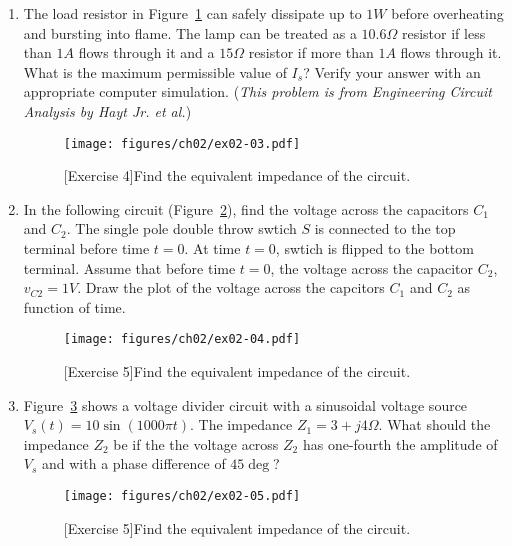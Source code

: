 \begin{enumerate}
    \item The load resistor in Figure~\ref{fig:ex02-03} can safely dissipate up to $1W$ before overheating and bursting into flame. The lamp can be treated as a $10.6\Omega$ resistor if less than $1A$ flows through it and a $15\Omega$ resistor if more than $1A$ flows through it. What is the maximum permissible value of $I_s$? Verify your answer with an appropriate computer simulation. (\textit{This problem is from Engineering Circuit Analysis by Hayt Jr. et al.})
    \begin{figure}[h]
        \centering
        \texttt{[image: figures/ch02/ex02-03.pdf]}
        \caption{[Exercise 4]Find the equivalent impedance of the circuit.}
        \label{fig:ex02-03}
    \end{figure}
    
    \item In the following circuit (Figure~\ref{fig:ex02-04}), find the voltage across the capacitors $C_1$ and $C_2$. The single pole double throw swtich $S$ is connected to the top terminal before time $t=0$. At time $t=0$, swtich is flipped to the bottom terminal.  Assume that before time $t=0$, the voltage across the capacitor $C_2$, $v_{C2} = 1V$. Draw the plot of the voltage across the capcitors $C_1$ and $C_2$ as function of time.
    \begin{figure}[h]
        \centering
        \texttt{[image: figures/ch02/ex02-04.pdf]}
        \caption{[Exercise 5]Find the equivalent impedance of the circuit.}
        \label{fig:ex02-04}
    \end{figure}
    
    \item Figure~\ref{fig:ex02-05} shows a voltage divider circuit with a sinusoidal voltage source $V_s\left(t\right) = 10 \sin\left(1000\pi t\right)$. The impedance $Z_1 = 3 + j4 \Omega$. What should the impedance $Z_2$ be if the the voltage across $Z_2$ has one-fourth the amplitude of $V_s$ and with a phase difference of $45\deg$?
    \begin{figure}[h]
        \centering
        \texttt{[image: figures/ch02/ex02-05.pdf]}
        \caption{[Exercise 5]Find the equivalent impedance of the circuit.}
        \label{fig:ex02-05}
    \end{figure}
\end{enumerate}